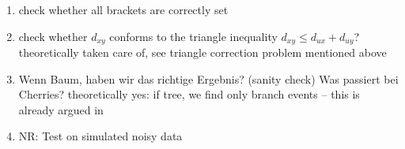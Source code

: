 \documentclass{article}
\newcommand{\TODO}[1]{\begingroup\color{red}#1\endgroup}
\newcommand{\PFS}[1]{\begingroup\color{green}#1\endgroup}
\begin{document}
\begin{enumerate}
 \item \TODO{check whether all brackets are correctly set} 
 \item \TODO{check whether $d_{xy}$ conforms to the triangle inequality
     $d_{xy} \leq d_{ux} + d_{uy}$?}  \PFS{theoretically taken care of, see
     triangle correction problem mentioned above}
 \item \TODO{Wenn Baum, haben wir das richtige Ergebnis? (sanity check) 
     Was passiert bei Cherries?} 
   \PFS{theoretically yes: if tree, we find only branch events -- this is 
     already argued in \cite{Prohaska:17a}}
 \item \TODO{NR: Test on simulated noisy data} \\
\end{enumerate}


      
   
\end{document}
